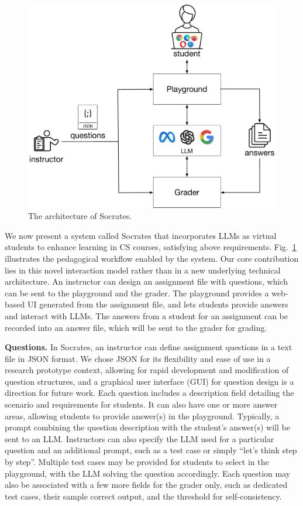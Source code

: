 \documentclass{article} %
\begin{document}
\begin{figure}
  \centering
  \includegraphics[width=\linewidth]{Socrates}
  \caption{The architecture of \textsf{Socrates}.}
  \label{fig:Socrates}
\end{figure}
We now present a system called \textsf{Socrates} that
incorporates LLMs as virtual students to enhance learning in CS
courses, satisfying above requirements. Fig.~\ref{fig:Socrates} illustrates the pedagogical workflow enabled by the system. Our core contribution lies in this novel interaction model rather than in a new underlying technical architecture.  An instructor can design an assignment file with
questions, which can be sent to the playground and the grader. The playground
provides a web-based UI generated from the assignment file, and lets students 
provide answers and interact with LLMs. The answers from a student for an
assignment can be recorded into an answer file, which will be sent to the grader
for grading.

\textbf{Questions.} In \textsf{Socrates}, an instructor can define assignment questions in
a text file in JSON format. We chose JSON for its flexibility and ease of use in a research prototype context, allowing for rapid development and modification of question structures, and a graphical user interface (GUI) for question design is a direction for future work. Each question includes a description field detailing the scenario and requirements for students. It can also have one or more
answer areas, allowing students to provide answer(s) in the playground. Typically, a prompt combining the question description with the student's answer(s) will be sent to an LLM. Instructors can also specify the LLM used for a particular question and an
additional prompt, such as a test case or simply ``let's think step by step''. Multiple test cases may be provided for students to select in the playground, with the LLM solving the question accordingly.
Each question may also be associated with a few more fields for the grader only,
such as dedicated test cases, their sample correct output, and the
threshold for self-consistency. 
\end{document}

